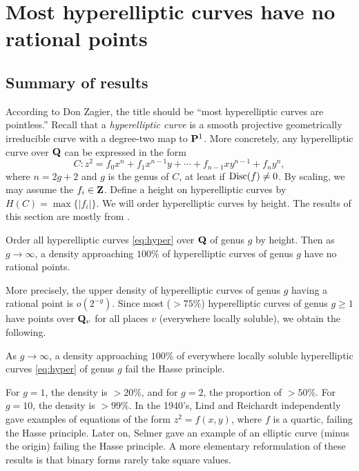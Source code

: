 
\section{Most hyperelliptic curves have no rational points}\label{sec:bhargava-iv}





\subsection{Summary of results}

According to Don Zagier, the title should be ``most hyperelliptic curves are 
pointless.'' Recall that a \emph{hyperelliptic curve} is a smooth projective 
geometrically irreducible curve with a degree-two map to $\mathbf{P}^1$. More 
concretely, any hyperelliptic curve over $\mathbf{Q}$ can be expressed in the form 
\begin{equation*}\tag{$\ast$}\label{eq:hyper}
  C:z^2 = f_0 x^n + f_1 x^{n-1} y + \cdots + f_{n-1} x y^{n-1} + f_n y^n ,
\end{equation*}
where $n=2 g+2$ and $g$ is the genus of $C$, at least if 
$\operatorname{Disc}(f)\ne 0$. By scaling, we may assume the $f_i\in \mathbf{Z}$. Define a 
height on hyperelliptic curves by $H(C)=\max\{|f_i|\}$. We will order 
hyperelliptic curves by height. The results of this section are mostly from 
\cite{bg13}. 

\begin{theo}
Order all hyperelliptic curves \eqref{eq:hyper} over $\mathbf{Q}$ of genus $g$ by 
height. Then as $g\to \infty$, a density approaching $100\%$ of hyperelliptic 
curves of genus $g$ have no rational points. 
\end{theo}

More precisely, the upper density of hyperelliptic curves of genus $g$ having a 
rational point is $o(2^{-g})$. Since most ($>75\%$) hyperelliptic curves of 
genus $g\geqslant 1$ have points over $\mathbf{Q}_v$ for all places $v$ (everywhere 
locally soluble), we obtain the following. 

\begin{coro}
As $g\to \infty$, a density approaching $100\%$ of everywhere locally soluble 
hyperelliptic curves \eqref{eq:hyper} of genus $g$ fail the Hasse principle. 
\end{coro}

For $g=1$, the density is $>20\%$, and for $g=2$, the proportion of 
$>50\%$. For $g=10$, the density is $>99\%$. In the 1940's, Lind and Reichardt 
independently gave examples of equations of the form $z^2=f(x,y)$, where $f$ is 
a quartic, failing the Hasse principle. Later on, Selmer gave an example of an 
elliptic curve (minus the origin) failing the Hasse principle. A more 
elementary reformulation of these results is that binary forms rarely take 
square values. 





